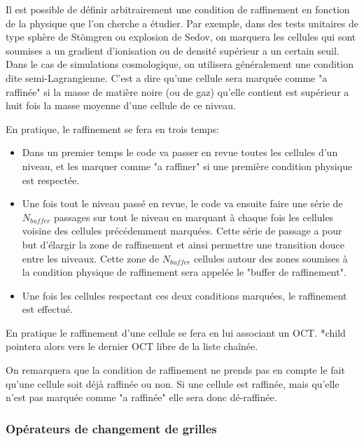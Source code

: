 Il est possible de définir arbitrairement une condition de raffinement en fonction de la physique que l'on cherche a étudier.
Par exemple, dans des tests unitaires de type sphère de Stömgren ou explosion de Sedov, on marquera les cellules qui sont soumises a un gradient d'ionisation ou de densité supérieur a un certain seuil.
Dans le cas de simulations cosmologique, on utilisera généralement une condition dite semi-Lagrangienne.
C'est a dire qu'une cellule sera marquée comme "a raffinée" si la masse de matière noire (ou de gaz) qu'elle contient est supérieur a huit fois la masse moyenne d'une cellule de ce niveau.



En pratique, le raffinement se fera en trois temps:

\begin{itemize}
\item Dans un premier temps le code va passer en revue toutes les cellules d'un niveau, et les marquer comme "a raffiner" si une première condition physique est respectée.

\item Une fois tout le niveau passé en revue, le code va ensuite faire une série de $N_{buffer}$ passages sur tout le niveau en marquant à chaque fois les cellules voisine des cellules précédemment marquées.
Cette série de passage a pour but d’élargir la zone de raffinement et ainsi permettre une transition douce entre les niveaux.
Cette zone de $N_{buffer}$ cellules autour des zones soumises à la condition physique de raffinement sera appelée le "buffer de raffinement".

\item Une fois les cellules respectant ces deux conditions marquées, le raffinement est effectué.
\end{itemize}

En pratique le raffinement d'une cellule se fera en lui associant un OCT.
*child pointera alors vers le dernier OCT libre de la liste chaînée.

On remarquera que la condition de raffinement ne prends pas en compte le fait qu'une cellule soit déjà raffinée ou non.
Si une cellule est raffinée, mais qu'elle n'est pas marquée comme "a raffinée" elle sera donc dé-raffinée.

\subsubsection{Opérateurs de changement de grilles} \label{Opérateurs de changement de grilles}

